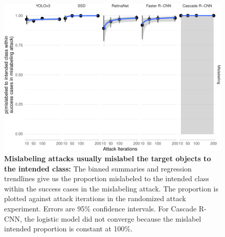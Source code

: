 \begin{figure}[tb]

{\centering \includegraphics{rmd_imgs/success_trend_mislabel_intended_graph-1} 

}

\caption{\textbf{Mislabeling attacks usually mislabel the target objects to the intended class:}  The binned summaries and regression trendlines give us the proportion mislabeled to the intended class within the success cases in the mislabeling attack. The proportion is plotted against attack iterations in the randomized attack experiment. Errors are 95\% confidence intervals.  For Cascade R-CNN, the logistic model did not converge because the mislabel intended proportion is constant at 100\%.}\label{fig:success_trend_mislabel_intended_graph}
\end{figure}

\begingroup\fontsize{9}{11}\selectfont

